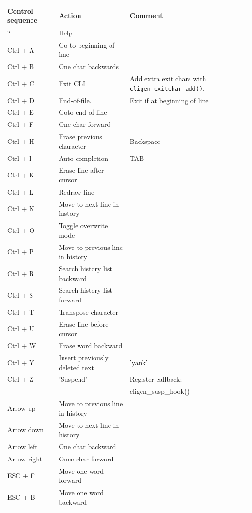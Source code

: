 \documentclass[a4paper, 10pt] {article}
\begin{document}
\begin{tabular}{ | l | l | l | }
\hline
  \textbf{ Control sequence} & \textbf{Action} & \textbf{Comment} \\
\hline
? & Help & \\
\hline
Ctrl + A & Go to beginning of line & \\
\hline
Ctrl + B & One char backwards & \\
\hline
Ctrl + C & Exit CLI & Add extra exit chars with {\tt cligen\_exitchar\_add()}.\\
\hline
Ctrl + D & End-of-file. & Exit if at beginning of line \\
\hline
Ctrl + E & Goto end of line & \\
\hline
Ctrl + F & One char forward & \\
\hline
Ctrl + H & Erase previous character & Backspace\\
\hline
Ctrl + I & Auto completion & TAB \\
\hline
Ctrl + K & Erase line after cursor & \\
\hline
Ctrl + L & Redraw line & \\
\hline
Ctrl + N & Move to next line in history & \\
\hline
Ctrl + O & Toggle overwrite mode & \\
\hline
Ctrl + P & Move to previous line in history & \\
\hline
Ctrl + R & Search history list backward & \\
\hline
Ctrl + S & Search history list forward & \\
\hline
Ctrl + T & Transpose character & \\
\hline
Ctrl + U & Erase line before cursor & \\
\hline
Ctrl + W & Erase word backward & \\
\hline
Ctrl + Y & Insert previously deleted text& 'yank' \\
\hline
Ctrl + Z & 'Suspend' & Register callback: \\&&cligen\_susp\_hook() \\
\hline
Arrow up & Move to previous line in history & \\
\hline
Arrow down & Move to next line in history & \\
\hline
Arrow left & One char backward & \\
\hline
Arrow right & Once char forward & \\
\hline
ESC + F & Move one word forward & \\
\hline
ESC + B & Move one word backward & \\
\hline
\end{tabular}
\end{document}
